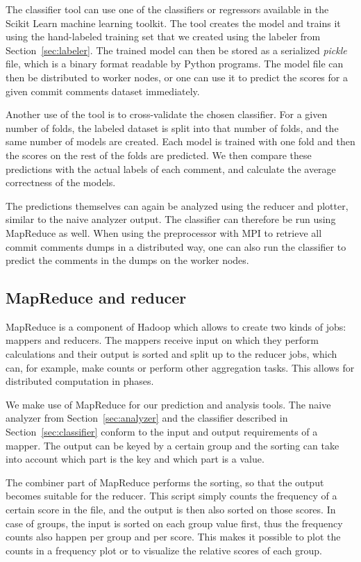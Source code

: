 \documentclass{article}
\begin{document}
The classifier tool can use one of the classifiers or regressors available in
the Scikit Learn machine learning toolkit. The tool creates the model and 
trains it using the hand-labeled training set that we created using the labeler
from Section~\ref{sec:labeler}. The trained model can then be stored as a
serialized \emph{pickle} file, which is a binary format readable by Python
programs. The model file can then be distributed to worker nodes, or one can
use it to predict the scores for a given commit comments dataset immediately.

Another use of the tool is to cross-validate the chosen classifier. For a given 
number of folds, the labeled dataset is split into that number of folds, and 
the same number of models are created. Each model is trained with one fold and 
then the scores on the rest of the folds are predicted. We then compare these 
predictions with the actual labels of each comment, and calculate the average 
correctness of the models.

The predictions themselves can again be analyzed using the reducer and plotter, 
similar to the naive analyzer output. The classifier can therefore be run using 
MapReduce as well. When using the preprocessor with MPI to retrieve all commit 
comments dumps in a distributed way, one can also run the classifier to predict
the comments in the dumps on the worker nodes.

\subsection{MapReduce and reducer}\label{sec:reducer}
MapReduce is a component of Hadoop which allows to create two kinds of jobs: 
mappers and reducers. The mappers receive input on which they perform 
calculations and their output is sorted and split up to the reducer jobs, which 
can, for example, make counts or perform other aggregation tasks. This allows 
for distributed computation in phases.

We make use of MapReduce for our prediction and analysis tools. The naive 
analyzer from Section~\ref{sec:analyzer} and the classifier described in 
Section~\ref{sec:classifier} conform to the input and output requirements of 
a mapper. The output can be keyed by a certain group and the sorting can take 
into account which part is the key and which part is a value.

The combiner part of MapReduce performs the sorting, so that the output becomes 
suitable for the reducer. This script simply counts the frequency of a certain 
score in the file, and the output is then also sorted on those scores. In case 
of groups, the input is sorted on each group value first, thus the frequency
counts also happen per group and per score. This makes it possible to plot the
counts in a frequency plot or to visualize the relative scores of each group.
\end{document}

